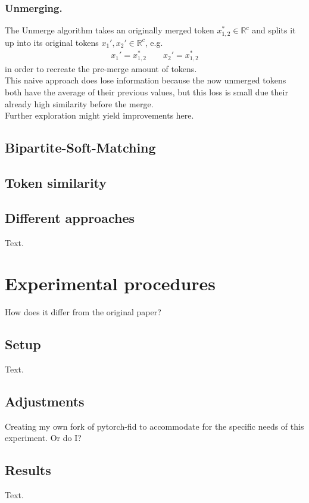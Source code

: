 \documentclass{article}
\begin{document}
\subsubsection*{Unmerging.} The Unmerge algorithm takes an originally merged token $x_{1,2}^* \in \mathbb{R}^c$ and splits it up into its original tokens $x_1', x_2' \in \mathbb{R}^c$, e.g. 
\begin{align*}
    x_1' = x_{1,2}^* \quad\quad
    x_2' = x_{1,2}^*
\end{align*}
in order to recreate the pre-merge amount of tokens.\\
This naive approach does lose information because the now unmerged tokens both have the average of their previous values, but this loss is small due their already high similarity before the merge.\\ Further exploration might yield improvements here.

\subsection{Bipartite-Soft-Matching}


\subsection{Token similarity}

\subsection{Different approaches}
Text.





\newpage
\section{Experimental procedures}
How does it differ from the original paper?

\subsection{Setup}
Text.

\subsection{Adjustments}
Creating my own fork of pytorch-fid \cite{Seitzer2020FID} to accommodate for the specific needs of this experiment. Or do I?

\subsection{Results}
Text.
\end{document}
